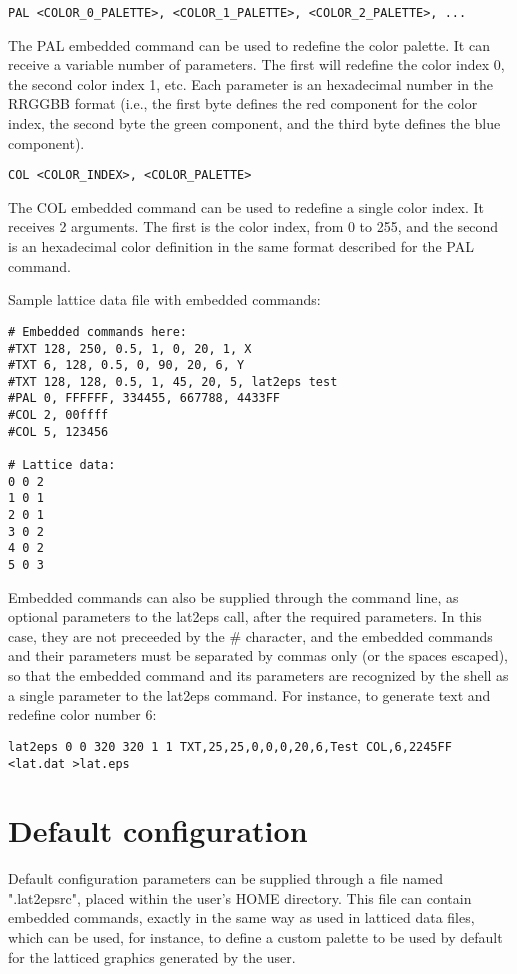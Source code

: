 \documentclass[a4paper]{article}
\begin{document}
\texttt{PAL <COLOR\_0\_PALETTE>, <COLOR\_1\_PALETTE>, <COLOR\_2\_PALETTE>, ...}\bigbreak

The PAL embedded command can be used to redefine the color palette. It can receive a variable number of parameters. The first will redefine the color index 0, the second color index 1, etc. Each parameter is an hexadecimal number in the RRGGBB format (i.e., the first byte defines the red component for the color index, the second byte the green component, and the third byte defines the blue component).
\bigbreak\bigbreak

\texttt{COL <COLOR\_INDEX>, <COLOR\_PALETTE>}\bigbreak

The COL embedded command can be used to redefine a single color index. It receives 2 arguments. The first is the color index, from 0 to 255, and the second is an hexadecimal color definition in the same format described for the PAL command.
\bigbreak\bigbreak

Sample lattice data file with embedded commands:
\bigbreak

\begin{lstlisting}
# Embedded commands here:
#TXT 128, 250, 0.5, 1, 0, 20, 1, X
#TXT 6, 128, 0.5, 0, 90, 20, 6, Y
#TXT 128, 128, 0.5, 1, 45, 20, 5, lat2eps test
#PAL 0, FFFFFF, 334455, 667788, 4433FF
#COL 2, 00ffff
#COL 5, 123456

# Lattice data:
0 0 2
1 0 1
2 0 1
3 0 2
4 0 2
5 0 3
\end{lstlisting}

\bigbreak

Embedded commands can also be supplied through the command line, as optional parameters to the lat2eps call, after the required parameters. In this case, they are not preceeded by the \# character, and the embedded commands and their parameters must be separated by commas only (or the spaces escaped), so that the embedded command and its parameters are recognized by the shell as a single parameter to the lat2eps command. For instance, to generate text and redefine color number 6:
\bigbreak

\texttt{lat2eps 0 0 320 320 1 1 TXT,25,25,0,0,0,20,6,Test COL,6,2245FF <lat.dat >lat.eps}


\section{Default configuration}

Default configuration parameters can be supplied through a file named ".lat2epsrc", placed within the user's HOME directory. This file can contain embedded commands, exactly in the same way as used in latticed data files, which can be used, for instance, to define a custom palette to be used by default for the latticed graphics generated by the user.
\bigbreak
\end{document}
